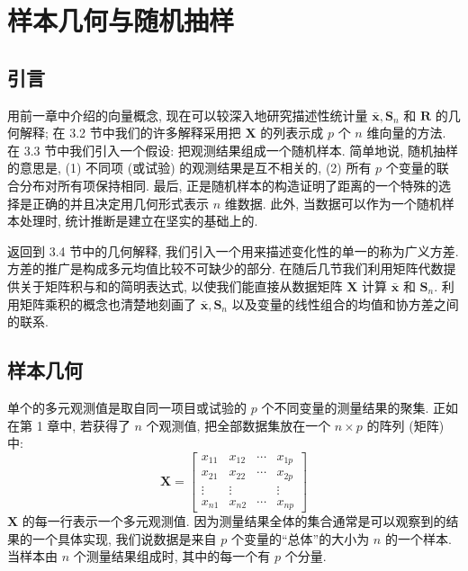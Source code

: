 \chapter{样本几何与随机抽样}
\label{chap:3}

\section{引言}
\label{sec:3.1}

用前一章中介绍的向量概念, 现在可以较深入地研究描述性统计量 $\bar{\mathbf{x}},\mathbf{S}_{n}$ 和 $\mathbf{R}$ 的几何解释; 在 3.2 节中我们的许多解释采用把 $\mathbf{X}$ 的列表示成 $p$ 个 $n$ 维向量的方法. 在 3.3 节中我们引入一个假设: 把观测结果组成一个随机样本. 简单地说, 随机抽样的意思是, (1) 不同项 (或试验) 的观测结果是互不相关的, (2) 所有 $p$ 个变量的联合分布对所有项保持相同. 最后, 正是随机样本的构造证明了距离的一个特殊的选择是正确的并且决定用几何形式表示 $n$ 维数据. 此外, 当数据可以作为一个随机样本处理时, 统计推断是建立在坚实的基础上的.

返回到 3.4 节中的几何解释, 我们引入一个用来描述变化性的单一的称为广义方差. 方差的推广是构成多元均值比较不可缺少的部分. 在随后几节我们利用矩阵代数提供关于矩阵积与和的简明表达式, 以使我们能直接从数据矩阵 $\mathbf{X}$ 计算 $\bar{\mathbf{x}}$ 和 $\mathbf{S}_{n}$. 利用矩阵乘积的概念也清楚地刻画了 $\bar{\mathbf{x}},\mathbf{S}_{n}$ 以及变量的线性组合的均值和协方差之间的联系.

\section{样本几何}
\label{sec:3.2}

单个的多元观测值是取自同一项目或试验的 $p$ 个不同变量的测量结果的聚集. 正如在第 1 章中, 若获得了 $n$ 个观测值, 把全部数据集放在一个 $n\times p$ 的阵列 (矩阵) 中:
\[
\mathbf{X}=\begin{bmatrix}
x_{11}&x_{12}&\cdots&x_{1p}\\
x_{21}&x_{22}&\cdots&x_{2p}\\
\vdots&\vdots&&\vdots\\
x_{n1}&x_{n2}&\cdots&x_{np}
\end{bmatrix}
\]
$\mathbf{X}$ 的每一行表示一个多元观测值. 因为测量结果全体的集合通常是可以观察到的结果的一个具体实现, 我们说数据是来自 $p$ 个变量的“总体”的大小为 $n$ 的一个样本. 当样本由 $n$ 个测量结果组成时, 其中的每一个有 $p$ 个分量.

